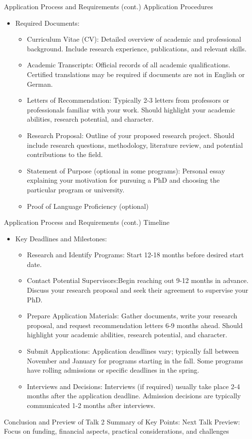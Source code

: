 \documentclass[10pt]{beamer}
\begin{document}
\begin{frame}[fragile]{Application Process and Requirements (cont.)}
\alert{Application Procedures}
\begin{itemize}
	\item Required Documents:
	\begin{itemize}
		\item Curriculum Vitae (CV): Detailed overview of academic and professional background. Include research experience, publications, and relevant skills.
		\item Academic Transcripts: Official records of all academic qualifications.
Certified translations may be required if documents are not in English or German.
		\item Letters of Recommendation: Typically 2-3 letters from professors or professionals familiar with your work.
Should highlight your academic abilities, research potential, and character.
		\item Research Proposal: Outline of your proposed research project.
Should include research questions, methodology, literature review, and potential contributions to the field.
		\item Statement of Purpose (optional in some programs): Personal essay explaining your motivation for pursuing a PhD and choosing the particular program or university.
		\item Proof of Language Proficiency (optional)
	\end{itemize}
\end{itemize}
\end{frame}

\begin{frame}[fragile]{Application Process and Requirements (cont.)}
\alert{Timeline}
\begin{itemize}
	\item Key Deadlines and Milestones:
	\begin{itemize}
		\item Research and Identify Programs: Start 12-18 months before desired start date.
		\item Contact Potential Supervisors:Begin reaching out 9-12 months in advance.
Discuss your research proposal and seek their agreement to supervise your PhD.
		\item Prepare Application Materials: Gather documents, write your research proposal, and request recommendation letters 6-9 months ahead.
Should highlight your academic abilities, research potential, and character.
		\item Submit Applications: Application deadlines vary; typically fall between November and January for programs starting in the fall.
Some programs have rolling admissions or specific deadlines in the spring.
		\item Interviews and Decisions: Interviews (if required) usually take place 2-4 months after the application deadline.
Admission decisions are typically communicated 1-2 months after interviews.
	\end{itemize}
\end{itemize}
\end{frame}

\begin{frame}[fragile]{Conclusion and Preview of Talk 2}
	Summary of Key Points:
	Next Talk Preview: Focus on funding, financial aspects, practical considerations, and challenges
\end{frame}
\end{document}
